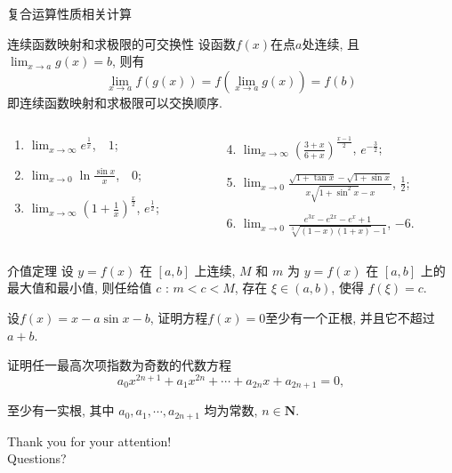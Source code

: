 \documentclass[
10pt,
aspectratio=43,
]{beamer}
\begin{document}
\begin{frame}{复合运算性质相关计算}
	\begin{block}{连续函数映射和求极限的可交换性}
		设函数$f(x)$在点$a$处连续, 且$\lim_{x\to a}g(x)=b$, 则有
		\[\lim_{x\to a}f(g(x))=f(\lim_{x\to a}g(x))=f(b)\]
		即连续函数映射和求极限可以交换顺序.
	\end{block}
	\pause
	\begin{block}{}
		\begin{columns}[onlytextwidth]
			\begin{column}{0.3\textwidth}
				\begin{enumerate}
					\item $\displaystyle \lim _{x \rightarrow \infty} e^{\frac{1}{x}}$, \pause\,\, $1$;\pause
					\item $\displaystyle \lim _{x \rightarrow 0} \ln \frac{\sin x}{x}$, \pause\,\, $0$;\pause
					\item $\displaystyle \lim _{x \rightarrow \infty}\left(1+\frac{1}{x}\right)^{\frac{x}{2}}$,\pause  \,\,$e^\frac{1}{2}$;\pause
				\end{enumerate}
			\end{column}
			\begin{column}{0.55\textwidth}
				\begin{enumerate}
					\setcounter{enumi}{3}
					\item $\displaystyle \lim _{x \rightarrow \infty}\left(\frac{3+x}{6+x}\right)^{\frac{x-1}{2}}$,\,\,\pause $e^{-\frac{3}{2}}$;\pause
					\item $\displaystyle \lim _{x \rightarrow 0} \frac{\sqrt{1+\tan x}-\sqrt{1+\sin x}}{x \sqrt{1+\sin ^2 x}-x}$,\,\,\pause $\displaystyle\frac{1}{2}$;\pause
					\item $\displaystyle \lim _{x \rightarrow 0} \frac{e^{3 x}-e^{2 x}-e^x+1}{\sqrt[3]{(1-x)(1+x)}-1}$,\,\,\pause $-6$.
				\end{enumerate}
			\end{column}
		\end{columns}
	\end{block}
\end{frame}

\begin{frame}
	\begin{block}{介值定理}
		设 $y=f(x)$ 在 $[a, b]$ 上连续, $M$ 和 $m$ 为 $y=f(x)$ 在 $[a, b]$ 上的最大值和最小值, 则任给值 $c$ : $m<c<M$, 存在 $\xi \in(a, b)$, 使得 $f(\xi)=c$.
	\end{block}
	\pause
	\begin{block}{}
		设$f(x)=x-a \sin x-b$, 证明方程$f(x)=0$至少有一个正根, 并且它不超过$a+b$.
	\end{block}
	\pause
	\begin{block}{}
		证明任一最高次项指数为奇数的代数方程
		$$
			a_0 x^{2 n+1}+a_1 x^{2 n}+\cdots+a_{2 n} x+a_{2 n+1}=0,
		$$

		至少有一实根, 其中 $a_0, a_1, \cdots, a_{2 n+1}$ 均为常数, $n \in \mathbf{N}$.
	\end{block}
\end{frame}

\begin{frame}[plain]
	\vfill
	\centering
	{
		\centering \Huge \color{white} Thank you for your attention!\\[10pt]Questions?\\
	}
	\vfill
\end{frame}
\end{document}
